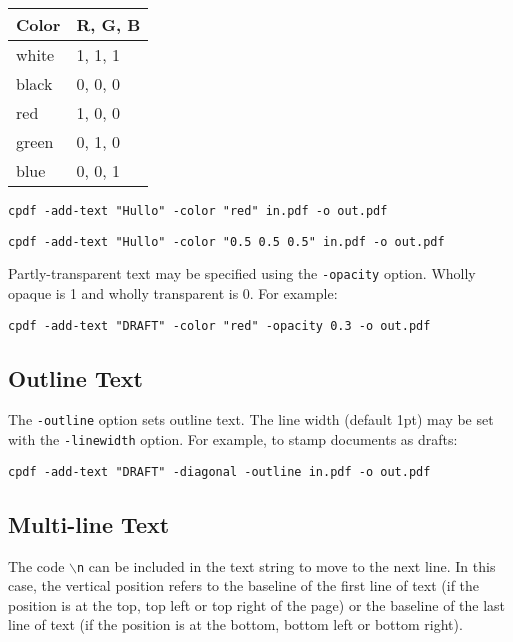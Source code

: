 \documentclass{book}
\begin{document}
  \vspace{2mm}
  \begin{tabular}{ll}
    \textbf{Color} & \textbf{R, G, B} \\ \hline
     white & 1, 1, 1\\
     black & 0, 0, 0\\
     red & 1, 0, 0\\
     green & 0, 1, 0\\
     blue & 0, 0, 1\\
  \end{tabular}

  \begin{framed}
    \small\verb!cpdf -add-text "Hullo" -color "red" in.pdf -o out.pdf!
    
    \vspace{1.5mm}
    \small\verb!cpdf -add-text "Hullo" -color "0.5 0.5 0.5" in.pdf -o out.pdf!
  \end{framed}

\noindent Partly-transparent text may be specified using the \verb!-opacity! option. Wholly opaque is 1 and wholly transparent is 0. For example:

\begin{framed}
  \small\verb!cpdf -add-text "DRAFT" -color "red" -opacity 0.3 -o out.pdf!
\end{framed}

\subsection{Outline Text}

  The \texttt{-outline} option sets outline text. The line width (default 1pt)
  may be set with the \texttt{-linewidth} option. For example, to stamp
  documents as drafts:

  \begin{framed}
    \small\verb!cpdf -add-text "DRAFT" -diagonal -outline in.pdf -o out.pdf!
    
  \end{framed}

\subsection{Multi-line Text}

The code \texttt{$\backslash$n} can be included in the text string to move to
the next line. In this case, the vertical position refers to the baseline of
the first line of text (if the position is at the top, top left or top right of
the page) or the baseline of the last line of text (if the position is at the
bottom, bottom left or bottom right).
\end{document}
